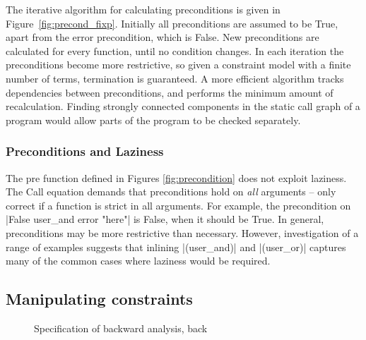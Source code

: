 \documentclass[preprint]{sigplanconf}
\newcommand{\C}[1]{\textsf{#1}}
\begin{document}
The iterative algorithm for calculating preconditions is given in Figure~\ref{fig:precond_fixp}. Initially all preconditions are assumed to be True, apart from the \C{error} precondition, which is False. New preconditions are calculated for every function, until no condition changes. In each iteration the preconditions become more restrictive, so given a constraint model with a finite number of terms, termination is guaranteed. A more efficient algorithm tracks dependencies between preconditions, and performs the minimum amount of recalculation. Finding strongly connected components in the static call graph of a program would allow parts of the program to be checked separately.

\subsubsection{Preconditions and Laziness}

The \C{pre} function defined in Figures \ref{fig:precondition} does not exploit laziness. The \C{Call} equation demands that preconditions hold on \textit{all} arguments -- only correct if a function is strict in all arguments. For example, the precondition on |False user_and error "here"| is False, when it should be True. In general, preconditions may be more restrictive than necessary. However, investigation of a range of examples suggests that inlining |(user_and)| and |(user_or)| captures many of the common cases where laziness would be required.


\subsection{Manipulating constraints}
\label{sec:backward}

\begin{figure}
\caption{Specification of backward analysis, \C{back}}
\label{fig:backward}
\end{figure}
\end{document}
